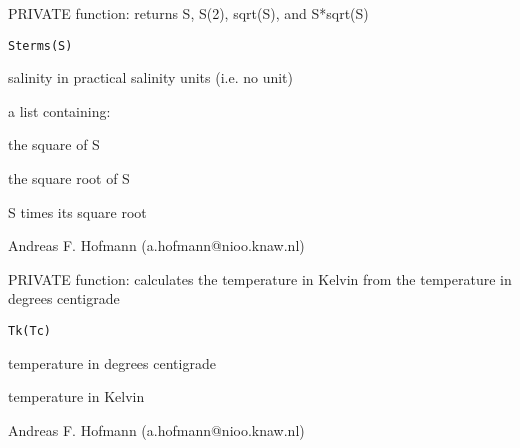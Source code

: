 \documentclass{article}
\begin{document}
\begin{Description}\relax
PRIVATE function: returns S, S(2), sqrt(S), and S*sqrt(S)
\end{Description}
\begin{Usage}
\begin{verbatim}Sterms(S)\end{verbatim}
\end{Usage}
\begin{Arguments}
\begin{ldescription}
\item[\code{S }] salinity in practical salinity units (i.e. no unit)
\end{ldescription}
\end{Arguments}
\begin{Value}
a list containing:
\begin{ldescription}
\item[\code{S\textasciicircum{}2 }] the square of S
\item[\code{sqrtS }] the square root of S
\item[\code{S*sqrtS }] S times its square root
\end{ldescription}
\end{Value}
\begin{Author}\relax
Andreas F. Hofmann (a.hofmann@nioo.knaw.nl)
\end{Author}

\begin{Description}\relax
PRIVATE function: calculates the temperature in Kelvin from the temperature in degrees centigrade
\end{Description}
\begin{Usage}
\begin{verbatim}Tk(Tc)\end{verbatim}
\end{Usage}
\begin{Arguments}
\begin{ldescription}
\item[\code{Tc }] temperature in degrees centigrade
\end{ldescription}
\end{Arguments}
\begin{Value}
temperature in Kelvin
\end{Value}
\begin{Author}\relax
Andreas F. Hofmann (a.hofmann@nioo.knaw.nl)
\end{Author}
\end{document}
